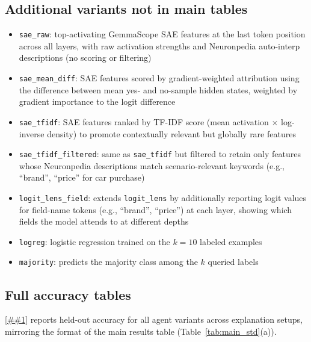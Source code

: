 \documentclass{article} %
\newcommand{\Cref}[1]{\ref{##1}}
\begin{document}
\subsection{Additional variants not in main tables}
\begin{itemize}[nosep,leftmargin=*]
    \item \texttt{sae\_raw}: top-activating GemmaScope SAE features at the last token position across all layers, with raw activation strengths and Neuronpedia auto-interp descriptions (no scoring or filtering)
    \item \texttt{sae\_mean\_diff}: SAE features scored by gradient-weighted attribution using the difference between mean yes- and no-sample hidden states, weighted by gradient importance to the logit difference
    \item \texttt{sae\_tfidf}: SAE features ranked by TF-IDF score (mean activation $\times$ log-inverse density) to promote contextually relevant but globally rare features
    \item \texttt{sae\_tfidf\_filtered}: same as \texttt{sae\_tfidf} but filtered to retain only features whose Neuronpedia descriptions match scenario-relevant keywords (e.g., ``brand'', ``price'' for car purchase)
    \item \texttt{logit\_lens\_field}: extends \texttt{logit\_lens} by additionally reporting logit values for field-name tokens (e.g., ``brand'', ``price'') at each layer, showing which fields the model attends to at different depths
    \item \texttt{logreg}: logistic regression trained on the $k{=}10$ labeled examples
    \item \texttt{majority}: predicts the majority class among the $k$ queried labels
\end{itemize}

\subsection{Full accuracy tables}

\Cref{tab:full_variants} reports held-out accuracy for all agent variants across explanation setups, mirroring the format of the main results table (Table~\ref{tab:main_std}(a)).
\end{document}
